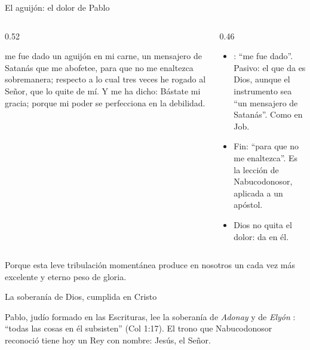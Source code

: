 \begin{frame}{El aguijón: el dolor de Pablo}
\begin{columns}[t,onlytextwidth]
\begin{column}{0.52\textwidth}
\begin{cita}me fue dado un aguijón en mi carne, un mensajero de Satanás que me abofetee, para que no me enaltezca sobremanera; respecto a lo cual tres veces he rogado al Señor, que lo quite de mí. Y me ha dicho: Bástate mi gracia; porque mi poder se perfecciona en la debilidad.\end{cita}
\end{column}
\begin{column}{0.46\textwidth}\small
\begin{itemize}
\item {}: ``me fue dado''. Pasivo: el que da es Dios, aunque el instrumento sea ``un mensajero de Satanás''. Como en Job.
\item Fin: ``para que no me enaltezca''. Es la lección de Nabucodonosor, aplicada a un apóstol.
\item Dios no quita el dolor: da  en él.
\end{itemize}
\end{column}
\end{columns}\par\smallskip
\begin{cita}Porque esta leve tribulación momentánea produce en nosotros un cada vez más excelente y eterno peso de gloria.\end{cita}
\end{frame}

\begin{frame}{La soberanía de Dios, cumplida en Cristo}
\centering
{}\par\medskip
\small\RaggedRight Pablo, judío formado en las Escrituras, lee la soberanía de \emph{Adonay} y de \emph{Elyón} : ``todas las cosas en él subsisten'' (Col 1:17). El trono que Nabucodonosor reconoció tiene hoy un Rey con nombre: Jesús, el Señor.
\end{frame}

